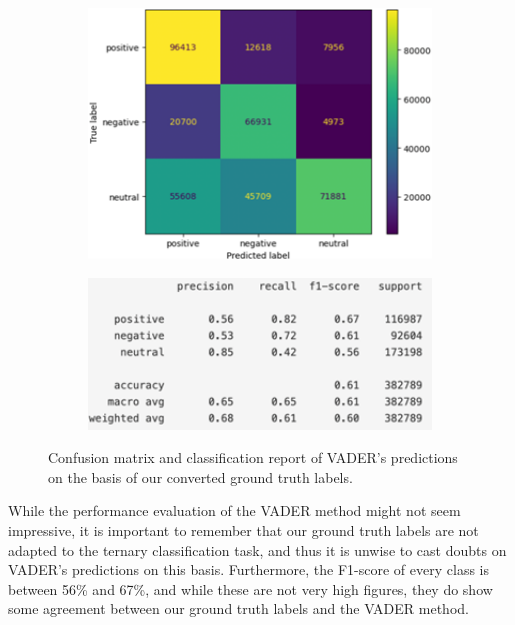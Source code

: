 \begin{figure}
    \centering
    \begin{subfigure}{0.49\columnwidth}
        \includegraphics[width=1\textwidth]{images/vader_conf.png}
    \end{subfigure}
    \centering
    \begin{subfigure}{0.49\columnwidth}
        \includegraphics[width=1\textwidth]{images/vader_class.png}
    \end{subfigure}
    \caption{Confusion matrix and classification report of VADER’s predictions on the basis of our converted ground truth labels.}
    \label{fig:vader}
\end{figure}

While the performance evaluation of the VADER method might not seem impressive, it is important to remember that our ground truth labels are not adapted to the ternary classification task, and thus it is unwise to cast doubts on VADER’s predictions on this basis. Furthermore, the F1-score of every class is between 56\% and 67\%, and while these are not very high figures, they do show some agreement between our ground truth labels and the VADER method.
